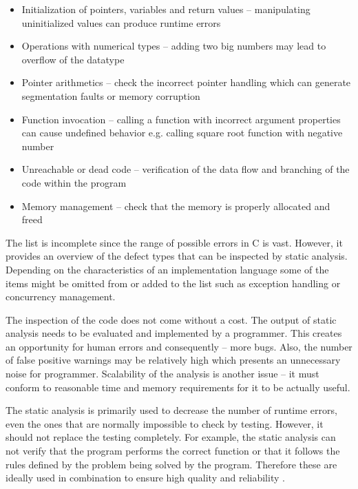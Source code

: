 \documentclass[12pt,final,oneside]{fithesis2}
\theoremstyle{definition}
\begin{document}
\begin{itemize}

\item Initialization of pointers, variables and return values --
manipulating uninitialized values can produce runtime errors

\item Operations with numerical types -- adding two big numbers may lead
to overflow of the datatype

\item Pointer arithmetics -- check the incorrect pointer handling which
can generate segmentation faults or memory corruption

\item Function invocation -- calling a function with incorrect argument
properties can cause undefined behavior e.g. calling square root
function with negative number

\item Unreachable or dead code -- verification of the data flow and
branching of the code within the program

\item Memory management -- check that the memory is properly allocated and
freed

\end{itemize}

The list is incomplete since the range of possible errors in C is
vast. However, it provides an overview of the defect types that can be
inspected by static analysis. Depending on the characteristics of an
implementation language some of the items might be omitted from or added
to the list such as exception handling or concurrency management.

The inspection of the code does not come without a cost.
The output of static analysis needs to be evaluated and implemented by a
programmer. This creates an opportunity for human errors and consequently --
more bugs. Also, the number of false positive warnings may be relatively
high which presents an unnecessary noise for programmer. Scalability
of the analysis is another issue -- it must conform to reasonable time
and memory requirements for it to be actually useful.

The static analysis is primarily used to decrease the number of runtime
errors, even the ones that are normally impossible to check by testing.
However, it should not replace the testing completely. For example,
the static analysis can not verify that the program performs the correct
function or that it follows the rules defined by the problem
being solved by the program. Therefore these are ideally used in
combination to ensure high quality and reliability \cite{Ernst03-1}.
\end{document}
